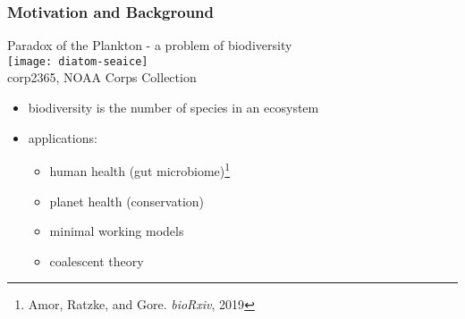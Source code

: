 \documentclass[dvipsnames]{beamer}
\begin{document}
\begin{frame}
\frametitle{Motivation and Background}
\begin{center}
	Paradox of the Plankton - a problem of biodiversity \\
	\texttt{[image: diatom-seaice]} \\
	\tiny{corp2365, NOAA Corps Collection}
\end{center}
\vspace{-0.5cm}
\begin{itemize}
	\item biodiversity is the number of species in an ecosystem
	\pause
	\item applications:
	\begin{itemize}
		\item human health (gut microbiome)\footnote{Amor, Ratzke, and Gore. \emph{bioRxiv}, 2019}
		\item planet health (conservation)
		\item minimal working models
		\item coalescent theory
	\end{itemize}
\end{itemize}
\end{frame}


\end{document}
